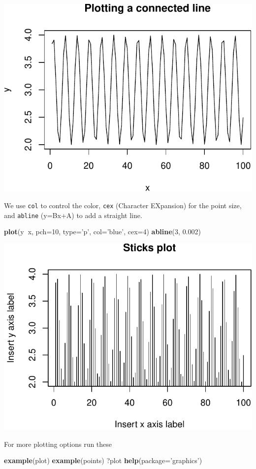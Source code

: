 \documentclass[]{book}
\newenvironment{Shaded}{\begin{snugshade}}{\end{snugshade}}
\newcommand{\DataTypeTok}[1]{\textcolor[rgb]{0.13,0.29,0.53}{#1}}
\newcommand{\DecValTok}[1]{\textcolor[rgb]{0.00,0.00,0.81}{#1}}
\newcommand{\FloatTok}[1]{\textcolor[rgb]{0.00,0.00,0.81}{#1}}
\newcommand{\KeywordTok}[1]{\textcolor[rgb]{0.13,0.29,0.53}{\textbf{#1}}}
\newcommand{\NormalTok}[1]{#1}
\newcommand{\OperatorTok}[1]{\textcolor[rgb]{0.81,0.36,0.00}{\textbf{#1}}}
\newcommand{\StringTok}[1]{\textcolor[rgb]{0.31,0.60,0.02}{#1}}
\theoremstyle{definition}
\theoremstyle{definition}
\theoremstyle{definition}
\theoremstyle{remark}
\begin{document}
\includegraphics[width=0.5\linewidth]{Rcourse_files/figure-latex/unnamed-chunk-34-1}

We use \texttt{col} to control the color, \texttt{cex} (Character EXpansion) for the point size, and \texttt{abline} (y=Bx+A) to add a straight line.

\begin{Shaded}
\begin{Highlighting}[]
\KeywordTok{plot}\NormalTok{(y}\OperatorTok{~}\NormalTok{x, }\DataTypeTok{pch=}\DecValTok{10}\NormalTok{, }\DataTypeTok{type=}\StringTok{'p'}\NormalTok{, }\DataTypeTok{col=}\StringTok{'blue'}\NormalTok{, }\DataTypeTok{cex=}\DecValTok{4}\NormalTok{) }
\KeywordTok{abline}\NormalTok{(}\DecValTok{3}\NormalTok{, }\FloatTok{0.002}\NormalTok{) }
\end{Highlighting}
\end{Shaded}

\includegraphics[width=0.5\linewidth]{Rcourse_files/figure-latex/unnamed-chunk-35-1}

For more plotting options run these

\begin{Shaded}
\begin{Highlighting}[]
\KeywordTok{example}\NormalTok{(plot)}
\KeywordTok{example}\NormalTok{(points)}
\NormalTok{?plot}
\KeywordTok{help}\NormalTok{(}\DataTypeTok{package=}\StringTok{'graphics'}\NormalTok{)}
\end{Highlighting}
\end{Shaded}
\end{document}
